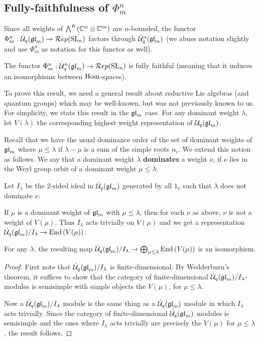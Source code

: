 \documentclass[11pt,leqno]{article}
\begin{document}
\subsection{Fully-faithfulness of $ \Phi_m^n$}
\label{sec:fully-faithful}

Since all weights of $\bigwedge^K(\mathbb{C}^n \otimes \mathbb{C}^m)$ are $ n$-bounded, the functor $\Phi_m^n: \dot{{\mathcal{U}}}_q({\mathfrak{gl}}_m)\rightarrow \mathcal{R}ep({\rm{SL}}_n)$ factors through $\dot{{\mathcal{U}}}_q^n({\mathfrak{gl}}_m)$ (we abuse notation slightly and use $\Phi_m^n$ as notation for this functor as well).

\begin{thm}\label{th:functorfullyfaithful}
The functor $\Phi_m^n: \dot{{\mathcal{U}}}_q^n({\mathfrak{gl}}_m) \rightarrow \mathcal{R}ep({\rm{SL}}_n)$ is fully faithful (meaning that it induces an isomorphisms between $\operatorname{Hom}$-spaces).
\end{thm}

To prove this result, we need a general result about reductive Lie algebras (and quantum groups) which may be well-known, but was not previously known to us.   For simplicity, we state this result in the $ {\mathfrak{gl}}_m $ case.  For any dominant weight $ \lambda $, let $V(\lambda)$ the corresponding highest weight representation of $ \mathcal{U}_q({\mathfrak{gl}}_m)$.

Recall that we have the usual dominance order of the set of dominant weights of $ {\mathfrak{gl}}_m $ where $ \mu \le \lambda $ if $ \lambda - \mu $ is a sum of the simple roots $ \alpha_i $.  We extend this notion as follows.  We say that a dominant weight $ \lambda $ \textbf{dominates} a weight $ \nu $, if $ \nu $ lies in the Weyl group orbit of a dominant weight $ \mu \le \lambda $.

Let $ I_\lambda $ be the 2-sided ideal in $\dot{{\mathcal{U}}}_q({\mathfrak{gl}}_m)$ generated by all $ 1_\nu $ such that $ \lambda $ does not dominate $ \nu $.

If $ \mu $ is a dominant weight of $ {\mathfrak{gl}}_m $ with $ \mu \le \lambda $, then for each $ \nu $ as above, $ \nu $ is not a weight of $V(\mu)$.  Thus $ I_\lambda $ acts trivially on $ V(\mu) $ and we get a representation $ \dot{{\mathcal{U}}}_q({\mathfrak{gl}}_m) / I_\lambda \rightarrow \operatorname{End}\left(V(\mu)\right) $.

\begin{lem}
For any $ \lambda $, the resulting map $ \dot{{\mathcal{U}}}_q({\mathfrak{gl}}_m) / I_\lambda \rightarrow \bigoplus_{\mu \le \lambda} \operatorname{End}\left(V(\mu)\right)$ is an isomorphism.
\end{lem}
\begin{proof}
First note that $\dot{{\mathcal{U}}}_q({\mathfrak{gl}}_m)/ I_\lambda $ is finite-dimensional.  By Wedderburn's theorem, it suffices to show that the category of finite-dimensional $\dot{{\mathcal{U}}}_q({\mathfrak{gl}}_m)/I_\lambda$-modules is semisimple with simple objects the $V(\mu)$, for $\mu \le \lambda$.

Now a $\dot{{\mathcal{U}}}_q({\mathfrak{gl}}_m)/I_\lambda$ module is the same thing as a $\dot{{\mathcal{U}}}_q({\mathfrak{gl}}_m) $ module in which $ I_\lambda $ acts trivially.  Since the category of finite-dimensional $ \dot{{\mathcal{U}}}_q({\mathfrak{gl}}_m) $ modules is semisimple and the ones where $ I_\lambda $ acts trivially are precisely the $ V(\mu) $ for $ \mu \le \lambda$, the result follows.
\end{proof}
\end{document}
